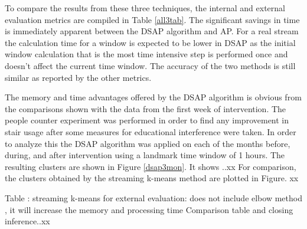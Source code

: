 To compare the results from these three techniques, the internal and external evaluation metrics are compiled in Table \ref{all3tab}. The significant savings in time is immediately apparent between the DSAP algorithm and AP. For a real stream the calculation time for a window is expected to be lower in DSAP as the initial window calculation that is the most time intensive step is performed once and doesn't affect the current time window. The accuracy of the two methods is still similar as reported by the other metrics. 

The memory and time advantages offered by the DSAP algorithm is obvious from the comparisons shown with the data from the first week of intervention. The people counter experiment was performed in order to find any improvement in stair usage after some measures for educational interference were taken. In order to analyze this the DSAP algorithm was applied on each of the months before, during, and after intervention using a landmark time window of 1 hours. The resulting clusters are shown in Figure \ref{dsap3mon}. It shows ..xx
For comparison, the clusters obtained by the streaming k-means method are plotted in Figure. xx


Table : streaming k-means for external evaluation: does not include elbow method , it will increase the memory and processing time  
Comparison table and closing inference..xx

